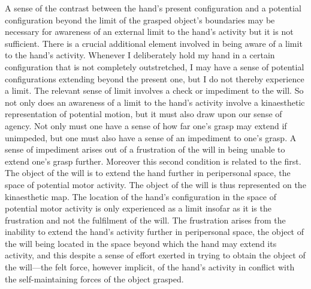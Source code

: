 A sense of the contrast between the hand's present configuration and a potential configuration beyond the limit of the grasped object's boundaries may be necessary for awareness of an external limit to the hand's activity but it is not sufficient. There is a crucial additional element involved in being aware of a limit to the hand's activity. Whenever I deliberately hold my hand in a certain configuration that is not completely outstretched, I may have a sense of potential configurations extending beyond the present one, but I do not thereby experience a limit. The relevant sense of limit involves a check or impediment to the will. So not only does an awareness of a limit to the hand's activity involve a kinaesthetic representation of potential motion, but it must also draw upon our sense of agency. Not only must one have a sense of how far one's grasp may extend if unimpeded, but one must also have a sense of an impediment to one's grasp. A sense of impediment arises out of a frustration of the will in being unable to extend one's grasp further. Moreover this second condition is related to the first. The object of the will is to extend the hand further in peripersonal space, the space of potential motor activity. The object of the will is thus represented on the kinaesthetic map. The location of the hand's configuration in the space of potential motor activity is only experienced as a limit insofar as it is the frustration and not the fulfilment of the will. The frustration arises from the inability to extend the hand's activity further in peripersonal space, the object of the will being located in the space beyond which the hand may extend its activity, and this despite a sense of effort exerted in trying to obtain the object of the will---the felt force, however implicit, of the hand's activity in conflict with the self-maintaining forces of the object grasped.

